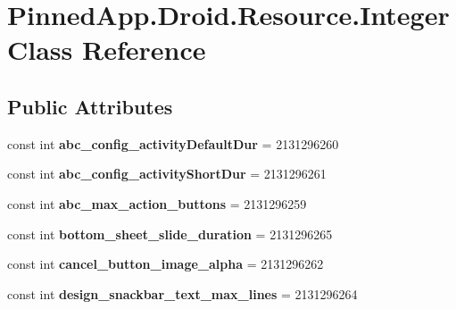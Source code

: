 \hypertarget{class_pinned_app_1_1_droid_1_1_resource_1_1_integer}{}\section{Pinned\+App.\+Droid.\+Resource.\+Integer Class Reference}
\label{class_pinned_app_1_1_droid_1_1_resource_1_1_integer}
\subsection*{Public Attributes}
\begin{DoxyCompactItemize}
\item 
\mbox{\label{class_pinned_app_1_1_droid_1_1_resource_1_1_integer_a83c16deb41b840549077235a4c04ea2d}} 
const int {\bfseries abc\+\_\+config\+\_\+activity\+Default\+Dur} = 2131296260
\item 
\mbox{\label{class_pinned_app_1_1_droid_1_1_resource_1_1_integer_a4452c003dcef48b87228e02527704d80}} 
const int {\bfseries abc\+\_\+config\+\_\+activity\+Short\+Dur} = 2131296261
\item 
\mbox{\label{class_pinned_app_1_1_droid_1_1_resource_1_1_integer_a992ab6b1f0e824ecbd5e9aa800ee2859}} 
const int {\bfseries abc\+\_\+max\+\_\+action\+\_\+buttons} = 2131296259
\item 
\mbox{\label{class_pinned_app_1_1_droid_1_1_resource_1_1_integer_a25b3b4f933286b70c4a996413b7aed46}} 
const int {\bfseries bottom\+\_\+sheet\+\_\+slide\+\_\+duration} = 2131296265
\item 
\mbox{\label{class_pinned_app_1_1_droid_1_1_resource_1_1_integer_a68160889efba6c7241653913de491000}} 
const int {\bfseries cancel\+\_\+button\+\_\+image\+\_\+alpha} = 2131296262
\item 
\mbox{\label{class_pinned_app_1_1_droid_1_1_resource_1_1_integer_ab74a033cd816530820be229876e6467a}} 
const int {\bfseries design\+\_\+snackbar\+\_\+text\+\_\+max\+\_\+lines} = 2131296264

\end{DoxyCompactItemize}
